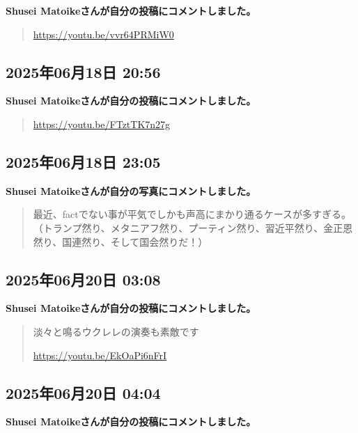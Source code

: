 \textbf{Shusei Matoikeさんが自分の投稿にコメントしました。}

\begin{quote}
\url{https://youtu.be/vvr64PRMiW0}
\end{quote}

\subsection*{2025年06月18日 20:56}

\textbf{Shusei Matoikeさんが自分の投稿にコメントしました。}

\begin{quote}
\url{https://youtu.be/FTztTK7n27g}
\end{quote}

\subsection*{2025年06月18日 23:05}

\textbf{Shusei Matoikeさんが自分の写真にコメントしました。}

\begin{quote}
最近、factでない事が平気でしかも声高にまかり通るケースが多すぎる。（トランプ然り、メタニアフ然り、プーティン然り、習近平然り、金正恩然り、国連然り、そして国会然りだ！）
\end{quote}

\subsection*{2025年06月20日 03:08}

\textbf{Shusei Matoikeさんが自分の投稿にコメントしました。}

\begin{quote}
淡々と鳴るウクレレの演奏も素敵です

\url{https://youtu.be/EkOaPi6nFrI}
\end{quote}

\subsection*{2025年06月20日 04:04}

\textbf{Shusei Matoikeさんが自分の投稿にコメントしました。}

